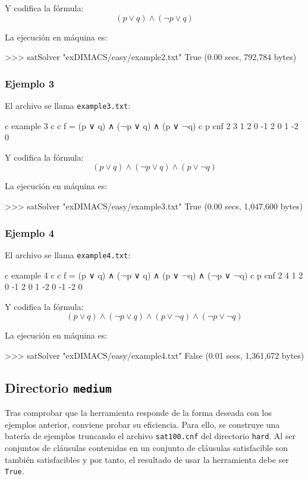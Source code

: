 Y codifica la fórmula:
$$(p \vee q) \wedge (\neg p \vee q)$$

La ejecución en máquina es:
\begin{code}
>>> satSolver "exDIMACS/easy/example2.txt"
True
(0.00 secs, 792,784 bytes)
\end{code}
\subsubsection{Ejemplo 3}
El archivo se llama \texttt{example3.txt}:
\begin{codigo}
c example 3
c 
c f = (p ∨ q) ∧ (¬p ∨ q) ∧ (p ∨ ¬q)
c
p cnf 2 3
1 2 0
-1 2 0
1 -2 0
\end{codigo}

Y codifica la fórmula:
$$(p \vee q)\wedge (\neg p \vee q)\wedge ( p \vee \neg q)$$

La ejecución en máquina es:
\begin{code}
>>> satSolver "exDIMACS/easy/example3.txt"
True
(0.00 secs, 1,047,600 bytes)
\end{code}
\subsubsection{Ejemplo 4}
El archivo se llama \texttt{example4.txt}:
\begin{codigo}
c example 4
c 
c f = (p ∨ q) ∧ (¬p ∨ q) ∧ (p ∨ ¬q) ∧ (¬p ∨ ¬q)
c
p cnf 2 4
1 2 0
-1 2 0
1 -2 0
-1 -2 0
\end{codigo}

Y codifica la fórmula:
$$(p \vee q)\wedge (\neg p \vee q)\wedge ( p \vee \neg q)\wedge (\neg p \vee \neg q)$$

La ejecución en máquina es:
\begin{code}
>>> satSolver "exDIMACS/easy/example4.txt"
False
(0.01 secs, 1,361,672 bytes)
\end{code}

\newpage
\subsection{Directorio \texttt{medium}}
Tras comprobar que la herramienta responde de la forma deseada con los ejemplos anterior, conviene probar su eficiencia. Para ello, se construye una batería de ejemplos truncando el archivo \texttt{sat100.cnf} del directorio \texttt{hard}. Al ser conjuntos de cláusulas contenidas en un conjunto de cláusulas satisfacible son también satisfacibles y por tanto, el resultado de usar la herramienta debe ser \texttt{True}.

